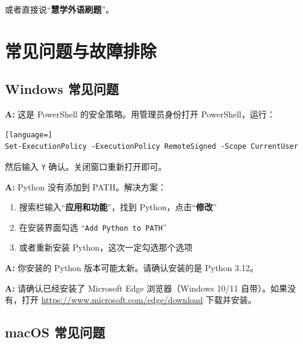 \documentclass[12pt,a4paper]{ctexart}
\begin{document}
或者直接说``\textbf{慧学外语刷题}''。

\newpage
\section{常见问题与故障排除}

\subsection{Windows 常见问题}

\begin{tipbox}
  \textbf{A:} 这是 PowerShell 的安全策略。用管理员身份打开 PowerShell，运行：
    \begin{lstlisting}[language=]
Set-ExecutionPolicy -ExecutionPolicy RemoteSigned -Scope CurrentUser
\end{lstlisting}
  然后输入 \texttt{Y} 确认。关闭窗口重新打开即可。
\end{tipbox}

\begin{tipbox}
  \textbf{A:} Python 没有添加到 PATH。解决方案：
  \begin{enumerate}[nosep]
    \item 搜索栏输入``\textbf{应用和功能}''，找到 Python，点击``\textbf{修改}''
    \item 在安装界面勾选 ``\texttt{Add Python to PATH}''
    \item 或者重新安装 Python，这次一定勾选那个选项
  \end{enumerate}
\end{tipbox}

\begin{tipbox}
  \textbf{A:} 你安装的 Python 版本可能太新。请确认安装的是 Python 3.12。
\end{tipbox}

\begin{tipbox}
  \textbf{A:} 请确认已经安装了 Microsoft Edge 浏览器（Windows 10/11
  自带）。如果没有，打开 \url{https://www.microsoft.com/edge/download} 下载并安装。
\end{tipbox}

\subsection{macOS 常见问题}
\end{document}
